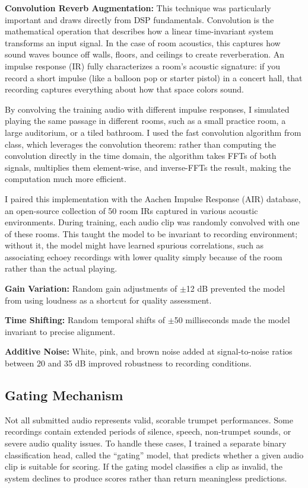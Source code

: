 \documentclass[10pt, a4paper, twocolumn]{article}
\begin{document}
\textbf{Convolution Reverb Augmentation:} This technique was particularly important and draws directly from DSP fundamentals. Convolution is the mathematical operation that describes how a linear time-invariant system transforms an input signal. In the case of room acoustics, this captures how sound waves bounce off walls, floors, and ceilings to create reverberation. An impulse response (IR) fully characterizes a room's acoustic signature: if you record a short impulse (like a balloon pop or starter pistol) in a concert hall, that recording captures everything about how that space colors sound.

By convolving the training audio with different impulse responses, I simulated playing the same passage in different rooms, such as a small practice room, a large auditorium, or a tiled bathroom. I used the fast convolution algorithm from class, which leverages the convolution theorem: rather than computing the convolution directly in the time domain, the algorithm takes FFTs of both signals, multiplies them element-wise, and inverse-FFTs the result, making the computation much more efficient.

I paired this implementation with the Aachen Impulse Response (AIR) database, an open-source collection of 50 room IRs captured in various acoustic environments. During training, each audio clip was randomly convolved with one of these rooms. This taught the model to be invariant to recording environment; without it, the model might have learned spurious correlations, such as associating echoey recordings with lower quality simply because of the room rather than the actual playing.

\textbf{Gain Variation:} Random gain adjustments of $\pm$12 dB prevented the model from using loudness as a shortcut for quality assessment.

\textbf{Time Shifting:} Random temporal shifts of $\pm$50 milliseconds made the model invariant to precise alignment.

\textbf{Additive Noise:} White, pink, and brown noise added at signal-to-noise ratios between 20 and 35 dB improved robustness to recording conditions.

\subsection*{Gating Mechanism}

Not all submitted audio represents valid, scorable trumpet performances. Some recordings contain extended periods of silence, speech, non-trumpet sounds, or severe audio quality issues. To handle these cases, I trained a separate binary classification head, called the ``gating'' model, that predicts whether a given audio clip is suitable for scoring. If the gating model classifies a clip as invalid, the system declines to produce scores rather than return meaningless predictions.
\end{document}
